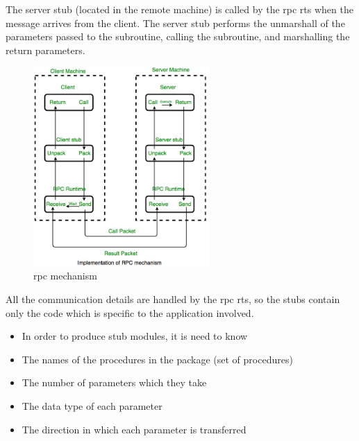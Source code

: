 The server stub (located in the remote machine) is called by the \acrshort{rpc} \acrshort{rts} when the message arrives from the client. The server stub performs the unmarshall of the parameters passed to the subroutine, calling the subroutine, and marshalling the return parameters.
\begin{figure}[h]
    \centering
    \includegraphics[width=0.6\textwidth]{images/State of the Art/json-rpc/rpc-mecha.png}
    \caption{\acrshort{rpc} mechanism}
    \label{fig:rpc_mechanism}
\end{figure}
All the communication details are handled by the \acrshort{rpc} \acrshort{rts}, so the stubs contain only the code which is specific to the application involved\cite{rpc2}.
\begin{itemize}
    \item In order to produce stub modules, it is need to know
    \item The names of the procedures in the package (set of procedures)
    \item The number of parameters which they take
    \item The data type of each parameter
    \item The direction in which each parameter is transferred
\end{itemize}
